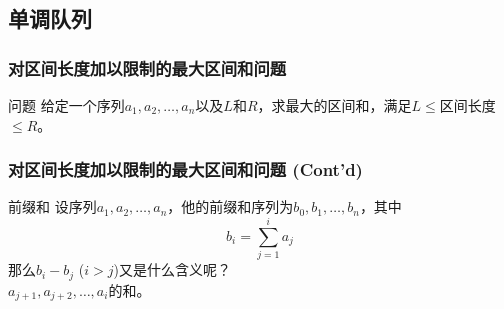 \documentclass[hyperref={unicode=true}]{beamer}
\theoremstyle{definition}
\theoremstyle{proof}
\begin{document}
\subsection{单调队列}
\begin{frame}\frametitle{对区间长度加以限制的最大区间和问题}
  \begin{block}{问题}
    给定一个序列$a_1,a_2,\ldots,a_n$以及$L$和$R$，求最大的区间和，满足$L\leq$区间长度$\leq R$。
  \end{block}
\end{frame}

\begin{frame}\frametitle{对区间长度加以限制的最大区间和问题 (Cont'd)}
  \begin{alertblock}{前缀和}
    设序列$a_1,a_2,\ldots,a_n$，他的前缀和序列为$b_0,b_1,\ldots,b_n$，其中
    \[b_i=\sum_{j=1}^i a_j\]
    那么$b_i-b_j$ ($i>j$)又是什么含义呢？\\
    \pause{}$a_{j+1},a_{j+2},\ldots,a_i$的和。
  \end{alertblock}
\end{frame}
\end{document}
